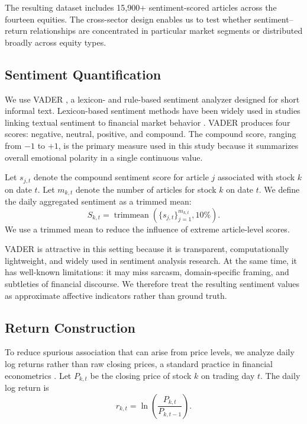 \documentclass[lettersize,journal]{IEEEtran}
\begin{document}
The resulting dataset includes 15{,}900+ sentiment-scored articles across the fourteen equities. The cross-sector design enables us to test whether sentiment--return relationships are concentrated in particular market segments or distributed broadly across equity types.


\subsection{Sentiment Quantification}

We use VADER \cite{hutto2014vader}, a lexicon- and rule-based sentiment analyzer designed for short informal text. Lexicon-based sentiment methods have been widely used in studies linking textual sentiment to financial market behavior \cite{tetlock2007giving, LI2014826}. VADER produces four scores: negative, neutral, positive, and compound. The compound score, ranging from $-1$ to $+1$, is the primary measure used in this study because it summarizes overall emotional polarity in a single continuous value.

Let $s_{j,t}$ denote the compound sentiment score for article $j$ associated with stock $k$ on date $t$. Let $m_{k,t}$ denote the number of articles for stock $k$ on date $t$. We define the daily aggregated sentiment as a trimmed mean:
\begin{equation}
S_{k,t} = \operatorname{trimmean}\left(\{s_{j,t}\}_{j=1}^{m_{k,t}}, 10\%\right).
\end{equation}
We use a trimmed mean to reduce the influence of extreme article-level scores.

VADER is attractive in this setting because it is transparent, computationally lightweight, and widely used in sentiment analysis research. At the same time, it has well-known limitations: it may miss sarcasm, domain-specific framing, and subtleties of financial discourse. We therefore treat the resulting sentiment values as approximate affective indicators rather than ground truth.

\subsection{Return Construction}

To reduce spurious association that can arise from price levels, we analyze daily log returns rather than raw closing prices, a standard practice in financial econometrics \cite{campbell1997econometrics}. Let $P_{k,t}$ be the closing price of stock $k$ on trading day $t$. The daily log return is
\begin{equation}
r_{k,t} = \ln\left(\frac{P_{k,t}}{P_{k,t-1}}\right).
\label{eq:log_return_main2}
\end{equation}
\end{document}
